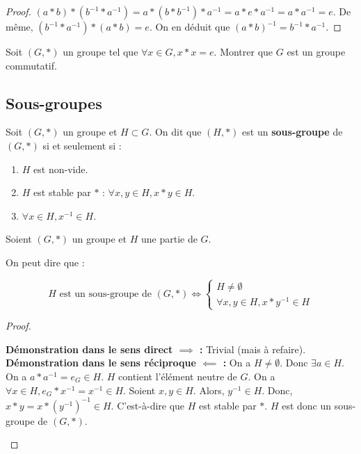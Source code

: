 \documentclass[12pt, a4paper]{report}
\begin{document}
\begin{proof}
    $(a*b)*(b^{-1} * a^{-1}) = a*(b*b^{-1})*a^{-1} = a*e*a^{-1} = a*a^{-1} = e$.
    De même, $(b^{-1} * a^{-1})*(a*b) = e$.
    On en déduit que $(a*b)^{-1}=b^{-1} * a^{-1}$.
\end{proof}

\begin{exercise}
    Soit $(G,*)$ un groupe tel que $\forall x \in G, x*x = e$. Montrer que $G$ est un groupe commutatif.
\end{exercise}

\subsection{Sous-groupes}

\begin{definition}
    Soit $(G,*)$ un groupe et $H \subset G$.
    On dit que $(H,*)$ est un \textbf{sous-groupe} de $(G,*)$ si et seulement si :
    \begin{enumerate}
        \item $H$ est non-vide.
        \item $H$ est stable par $*$ : $\forall x,y\in H, x*y \in H$.
        \item $\forall x \in H, x^{-1} \in H$.
    \end{enumerate}
\end{definition}

\begin{property}
    Soient $(G,*)$ un groupe et $H$ une partie de $G$.

    On peut dire que :

    $$H \text{ est un sous-groupe de }(G,*) \iff \begin{cases}H\ne \emptyset\\ \forall x,y\in H, x*y^{-1} \in H\end{cases}$$
\end{property}

\begin{proof}
    \begin{outline}
        \1 \textbf{Démonstration dans le sens direct $\implies$ :} Trivial (mais à refaire).
        \1 \textbf{Démonstration dans le sens réciproque $\impliedby$ :}
            \2 On a $H\ne \emptyset$.
            \2 Donc $\exists a \in H$.
            \2 On a $a*a^{-1} = \boxed{e_G \in H}$.
                \3 $H$ contient l'élément neutre de $G$.
            \2 On a $\forall x \in H, e_G * x^{-1} = x^{-1} \in H$.
            \2 Soient $x,y\in H$. Alors, $y^{-1} \in H$.
            \2 Donc, $x*y = x*(y^{-1})^{-1} \in H$.
                \3 C'est-à-dire que $H$ est stable par $*$.
            \2 $H$ est donc un sous-groupe de $(G,*)$.
    \end{outline}
\end{proof}
\end{document}
